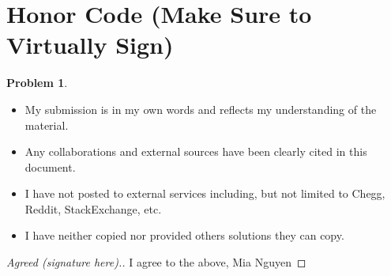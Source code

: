 \documentclass[11pt]{article}
\theoremstyle{definition}
\theoremstyle{definition}
\newtheorem{required}{Problem}
\theoremstyle{definition}
\begin{document}
\section{Honor Code (Make Sure to Virtually Sign)} \label{HonorCode}

\begin{required}
\begin{itemize}
\item My submission is in my own words and reflects my understanding of the material.
\item Any collaborations and external sources have been clearly cited in this document.
\item I have not posted to external services including, but not limited to Chegg, Reddit, StackExchange, etc.
\item I have neither copied nor provided others solutions they can copy.
\end{itemize}

\end{required}

\begin{proof}[Agreed (signature here).]
I agree to the above, Mia Nguyen
\end{proof}




\newpage
\end{document}
